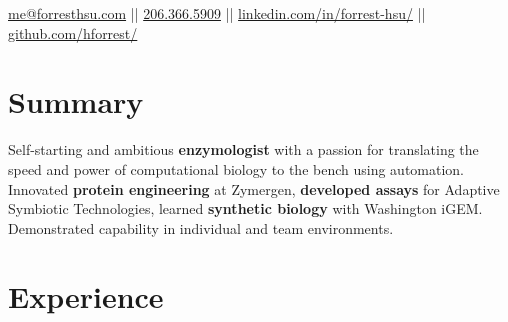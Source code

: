 \documentclass[]{forrest-resume-interfont}
\begin{document}
%
%

\lastupdated

%
%


%
%

{
	\href{mailto:me@forresthsu.com}{me@forresthsu.com} || 
	\href{tel:2063665909}{206.366.5909} || 
	\href{https://www.linkedin.com/in/forrest-hsu/}{linkedin.com/in/forrest-hsu/} ||
	\href{https://github.com/HForrest/}{github.com/hforrest/}
}

%
%
\spacesep
\section{ Summary}
\raggedright 

Self-starting and ambitious \textbf{enzymologist} with a passion for translating the speed and power of computational biology to the bench using automation. Innovated \textbf{protein engineering} at Zymergen, \textbf{developed assays} for Adaptive Symbiotic Technologies, learned \textbf{synthetic biology} with Washington iGEM. Demonstrated capability in individual and team environments.
 \spacesep
\linesep



\section{ Experience}
\\
\end{document}
